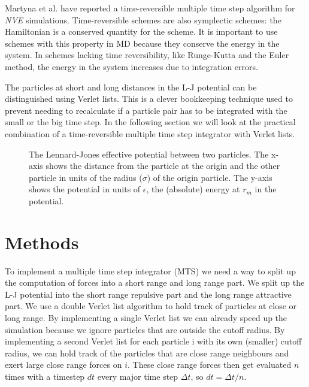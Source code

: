 \documentclass[a4paper]{article}
\begin{document}
Martyna et al. \cite{multi} have reported a time-reversible multiple time step algorithm for
\textit{NVE} simulations. Time-reversible schemes are also symplectic schemes: the Hamiltonian is a
conserved quantity for the scheme. \cite{wiki:symplectic} It is important to use schemes with this
property in MD because they conserve the energy in the system. In schemes lacking time
reversibility, like Runge-Kutta and the Euler method, the energy in the system increases due to
integration errors.

The particles at short and long distances in the L-J potential can be distinguished using Verlet
lists. This is a clever bookkeeping technique used to prevent needing to recalculate if a particle
pair has to be integrated with the small or the big time step. In the following section we will look
at the practical combination of a time-reversible multiple time step integrator with Verlet lists.

\begin{figure}
\center{\texttt{[image: lj]}}
\caption{The Lennard-Jones effective potential between two particles. The x-axis shows the distance
  from the particle at the origin and the other particle in units of the radius ($\sigma$) of the
  origin particle. The y-axis shows the potential in units of $\epsilon$, the (absolute) energy at
  $r_m$ in the potential.}
\label{fig:lj}
\end{figure}

\section{Methods}
To implement a multiple time step integrator (MTS) we need a way to split up the computation of
forces into a short range and long range part. We split up the L-J potential into the short range
repulsive part and the long range attractive part. We use a double Verlet list algorithm to hold
track of particles at close or long range. By implementing a single Verlet list we can already speed
up the simulation because we ignore particles that are outside the cutoff radius. By implementing a
second Verlet list for each particle i with its own (smaller) cutoff radius, we can hold track of
the particles that are close range neighbours and exert large close range forces on $i$. These close
range forces then get evaluated $n$ times with a timestep $dt$ every major time step $\Delta t$, so
$dt = \Delta t / n$.
\end{document}

